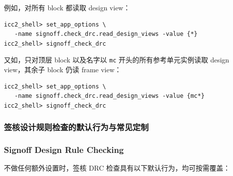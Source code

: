例如，对所有 block 都读取 design view：
\begin{lstlisting}
icc2_shell> set_app_options \
   -name signoff.check_drc.read_design_views -value {*}
icc2_shell> signoff_check_drc
\end{lstlisting}

又如，只对顶层 block 以及名字以 \texttt{mc} 开头的所有参考单元实例读取 design view，其余子 block 仍读 frame view：
\begin{lstlisting}
icc2_shell> set_app_options \
   -name signoff.check_drc.read_design_views -value {mc*}
icc2_shell> signoff_check_drc
\end{lstlisting}

\subsubsection{签核设计规则检查的默认行为与常见定制}
\subsubsection*{Signoff Design Rule Checking}

不做任何额外设置时，签核 DRC 检查具有以下默认行为，均可按需覆盖：

